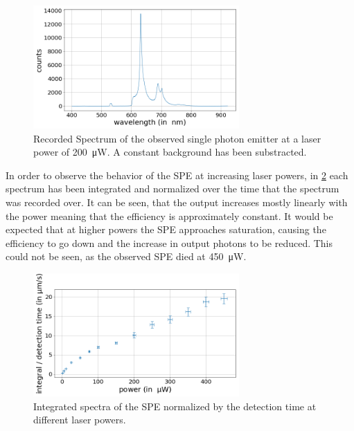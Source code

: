 \begin{figure}[H]
    \centering
    \includegraphics[width=0.7\textwidth]{img/output_t2/spektrum_example_bgcorr_200.0muW.png}
    \caption{Recorded Spectrum of the observed single photon emitter at a laser power of \SI{200}{\micro W}. A constant background has been substracted.}
    \label{fig_spe_spectrum_example}
\end{figure}

In order to observe the behavior of the SPE at increasing laser powers, in \cref{fig_spe_integrals} each spectrum has been integrated and normalized over the time that the spectrum was recorded over. %
It can be seen, that the output increases mostly linearly with the power meaning that the efficiency is approximately constant.
It would be expected that at higher powers the SPE approaches saturation, causing the efficiency to go down and the increase in output photons to be reduced.
This could not be seen, as the observed SPE died at \SI{450}{\micro W}.

\begin{figure}[H]
    \centering
    \includegraphics[width=0.7\textwidth]{img/output_t2/integrals.png}
    \caption{Integrated spectra of the SPE normalized by the detection time at different laser powers.}
    \label{fig_spe_integrals}
\end{figure}
